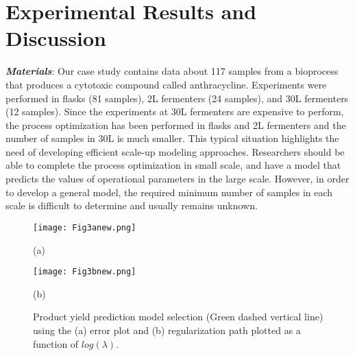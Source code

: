 \documentclass{article}
\begin{document}
\section{Experimental Results and Discussion}
\label{sec:resultsanddiscussion}

\textit{\textbf{Materials}}:
Our case study contains data about 117 samples from a bioprocess that produces a cytotoxic compound called anthracycline. Experiments were performed in flasks (81 samples), 2L fermenters (24 samples), and 30L fermenters (12 samples). Since the experiments at 30L fermenters are expensive to perform, the process optimization has been performed in flasks and 2L fermenters and the number of samples in 30L is much smaller. This typical situation highlights the need of developing efficient scale-up modeling approaches. Researchers should be able to complete the process optimization in small scale, and have a model that predicts the values of operational parameters in the large scale. However, in order to develop a general model, the required minimum number of samples in each scale is difficult to determine and usually remains unknown. 

\begin{figure}[t]

\begin{minipage}[b]{.48\linewidth}
  \centering
  \centerline{\texttt{[image: Fig3anew.png]}}
  \centerline{(a)}%
  \vspace{-4mm}
\end{minipage}
\hfill
\begin{minipage}[b]{0.48\linewidth}
  \centering
  \centerline{\texttt{[image: Fig3bnew.png]}}
  \centerline{(b)}%
  \vspace{-4mm}
\end{minipage}
%
\caption{Product yield prediction model selection (Green dashed vertical line) using the (a) error plot and (b) regularization path plotted as a function of $log(\lambda)$.}
\label{fig:modelselection}
\vspace{-2mm}
\end{figure}
\end{document}
